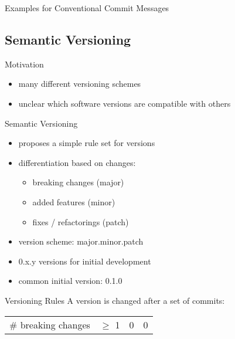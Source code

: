 \begin{frame}{Examples for Conventional Commit Messages}
	\centering{}
\end{frame}


\subsection{Semantic Versioning}
\begin{frame}{\insertsubsection}
	\begin{fancycolumns}[b]
		\begin{note}{Motivation} 
			\begin{itemize}
				\item many different versioning schemes
				\item unclear which software versions are compatible with others
			\end{itemize}
		\end{note}
		\begin{definition}{Semantic Versioning } 
			\begin{itemize}
				\item proposes a simple rule set for versions
				\item differentiation based on changes:
				\begin{itemize}
					\item breaking changes (major)
					\item added features (minor)
					\item fixes / refactorings (patch)
				\end{itemize}
				\item version scheme: major.minor.patch
				\item 0.x.y versions for initial development
				\item common initial version: 0.1.0
			\end{itemize}
		\end{definition}
		\nextcolumn
		\vspace{-5mm}
		\begin{note}{Versioning Rules }
			A version is changed after a set of commits:
			\begin{table}
				\begin{tabular}{lrrr}
					\toprule
					\#{} breaking changes & $\geq$ 1 & 0 & 0 \\

\end{tabular}
\end{table}
\end{note}
\end{fancycolumns}
\end{frame}

